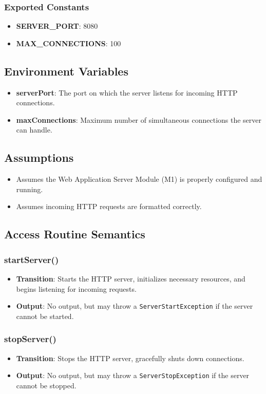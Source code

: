 \documentclass[12pt, titlepage]{article}
\begin{document}
\subsubsection{Exported Constants}
\begin{itemize}
    \item \textbf{SERVER\_PORT}: 8080
    \item \textbf{MAX\_CONNECTIONS}: 100
\end{itemize}

\subsection{Environment Variables}
\begin{itemize}
    \item \textbf{serverPort}: The port on which the server listens for incoming HTTP connections.
    \item \textbf{maxConnections}: Maximum number of simultaneous connections the server can handle.
\end{itemize}

\subsection{Assumptions}
\begin{itemize}
    \item Assumes the Web Application Server Module (M1) is properly configured and running.
    \item Assumes incoming HTTP requests are formatted correctly.
\end{itemize}

\subsection{Access Routine Semantics}
\subsubsection{startServer()}
\begin{itemize}
    \item \textbf{Transition}: Starts the HTTP server, initializes necessary resources, and begins listening for incoming requests.
    \item \textbf{Output}: No output, but may throw a \texttt{ServerStartException} if the server cannot be started.
\end{itemize}

\subsubsection{stopServer()}
\begin{itemize}
    \item \textbf{Transition}: Stops the HTTP server, gracefully shuts down connections.
    \item \textbf{Output}: No output, but may throw a \texttt{ServerStopException} if the server cannot be stopped.
\end{itemize}
\end{document}
